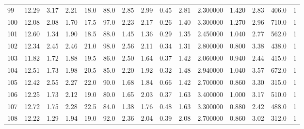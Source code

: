 \documentclass{article}
\begin{document}
\begin{tabular}{lrrrrrrrrrrrrrr}
    99  &    12.29 &        3.17 &  2.21 &               18.0 &       88.0 &           2.85 &        2.99 &                  0.45 &             2.81 &         2.300000 &  1.420 &                          2.83 &    406.0 &      1 \\
    100 &    12.08 &        2.08 &  1.70 &               17.5 &       97.0 &           2.23 &        2.17 &                  0.26 &             1.40 &         3.300000 &  1.270 &                          2.96 &    710.0 &      1 \\
    101 &    12.60 &        1.34 &  1.90 &               18.5 &       88.0 &           1.45 &        1.36 &                  0.29 &             1.35 &         2.450000 &  1.040 &                          2.77 &    562.0 &      1 \\
    102 &    12.34 &        2.45 &  2.46 &               21.0 &       98.0 &           2.56 &        2.11 &                  0.34 &             1.31 &         2.800000 &  0.800 &                          3.38 &    438.0 &      1 \\
    103 &    11.82 &        1.72 &  1.88 &               19.5 &       86.0 &           2.50 &        1.64 &                  0.37 &             1.42 &         2.060000 &  0.940 &                          2.44 &    415.0 &      1 \\
    104 &    12.51 &        1.73 &  1.98 &               20.5 &       85.0 &           2.20 &        1.92 &                  0.32 &             1.48 &         2.940000 &  1.040 &                          3.57 &    672.0 &      1 \\
    105 &    12.42 &        2.55 &  2.27 &               22.0 &       90.0 &           1.68 &        1.84 &                  0.66 &             1.42 &         2.700000 &  0.860 &                          3.30 &    315.0 &      1 \\
    106 &    12.25 &        1.73 &  2.12 &               19.0 &       80.0 &           1.65 &        2.03 &                  0.37 &             1.63 &         3.400000 &  1.000 &                          3.17 &    510.0 &      1 \\
    107 &    12.72 &        1.75 &  2.28 &               22.5 &       84.0 &           1.38 &        1.76 &                  0.48 &             1.63 &         3.300000 &  0.880 &                          2.42 &    488.0 &      1 \\
    108 &    12.22 &        1.29 &  1.94 &               19.0 &       92.0 &           2.36 &        2.04 &                  0.39 &             2.08 &         2.700000 &  0.860 &                          3.02 &    312.0 &      1 \\

\end{tabular}
\end{document}
